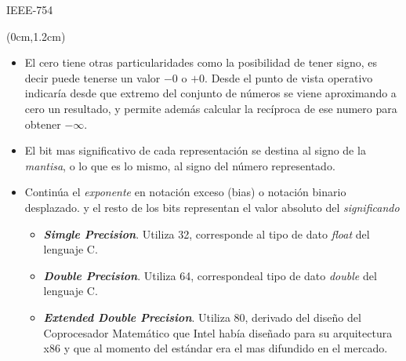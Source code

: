 \begin{frame}{IEEE-754}
 \begin{textblock*}{\textwidth}(0cm,1.2cm)
  \begin{itemize} [<+->]\justifying \parskip .15cm
   \item El cero tiene otras particularidades como la posibilidad de tener signo, es decir puede tenerse un valor $-0$ o $+0$. Desde el punto de vista operativo indicaría desde que extremo del conjunto de números se viene aproximando a cero un resultado, y permite además calcular la recíproca de ese numero para obtener $-\infty$.
   \item El bit mas significativo de cada representación se destina al signo de la \textit{mantisa}, o lo que es lo mismo, al signo del número representado.
   \item Continúa el \textit{exponente} en notación exceso (bias) o notación binario desplazado. y el resto de los bits representan el valor absoluto del \textit{significando}
   \begin{itemize}
    \item \textbf{\textit{Simgle Precision}}. Utiliza \SI{32}{\bit}, corresponde al tipo de dato \textit{float} del lenguaje C.
    \item \textbf{\textit{Double Precision}}. Utiliza \SI{64}{\bit}, correspondeal tipo de dato \textit{double} del lenguaje C.
    \item \textit{\textbf{Extended Double Precision}}. Utiliza \SI{80}{\bit}, derivado del diseño del Coprocesador Matemático que Intel había diseñado para su arquitectura x86 y que al momento del estándar era el mas difundido en el mercado.
   \end{itemize}
  \end{itemize}
 \end{textblock*}
\end{frame}


